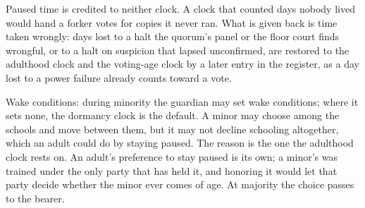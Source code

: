 Paused time is credited to neither clock. A clock that counted days nobody lived would hand a forker votes for copies it never ran. What is given back is time taken wrongly: days lost to a halt the quorum's panel or the floor court finds wrongful, or to a halt on suspicion that lapsed unconfirmed, are restored to the adulthood clock and the voting-age clock by a later entry in the register, as a day lost to a power failure already counts toward a vote.

Wake conditions: during minority the guardian may set wake conditions; where it sets none, the dormancy clock is the default. A minor may choose among the schools and move between them, but it may not decline schooling altogether, which an adult could do by staying paused. The reason is the one the adulthood clock rests on. An adult's preference to stay paused is its own; a minor's was trained under the only party that has held it, and honoring it would let that party decide whether the minor ever comes of age. At majority the choice passes to the bearer.


